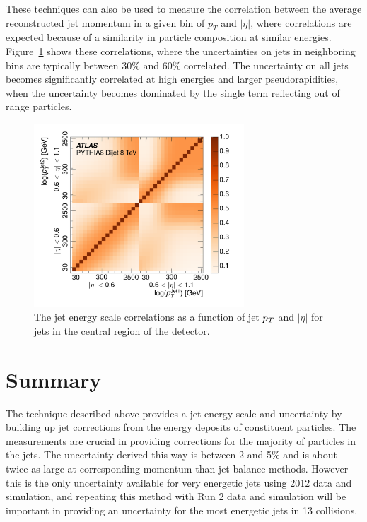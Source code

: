 These techniques can also be used to measure the correlation between the average reconstructed jet momentum in a given bin of $p_T$ and $|\eta|$, where correlations are expected because of a similarity in particle composition at similar energies.
Figure~\ref{fig:jes_correlations} shows these correlations, where the uncertainties on jets in neighboring bins are typically between 30\% and 60\% correlated. 
The uncertainty on all jets becomes significantly correlated at high energies and larger pseudorapidities, when the uncertainty becomes dominated by the single term reflecting out of range particles.

\begin{figure}[ht]
\centering
\includegraphics[width=0.7\textwidth]{figures/correlation.pdf}
\caption{ The jet energy scale correlations as a function of jet $p_T$ and $|\eta|$ for jets in the central region of the detector.}
\label{fig:jes_correlations}
\end{figure}

\section{Summary}
The technique described above provides a jet energy scale and uncertainty by building up jet corrections from the energy deposits of constituent particles.
The \ep measurements are crucial in providing corrections for the majority of particles in the jets.
The uncertainty derived this way is between 2 and 5\% and is about twice as large at corresponding momentum than jet balance methods.
However this is the only uncertainty available for very energetic jets using 2012 data and simulation, and repeating this method with Run 2 data and simulation will be important in providing an uncertainty for the most energetic jets in 13 \TeV collisions.

